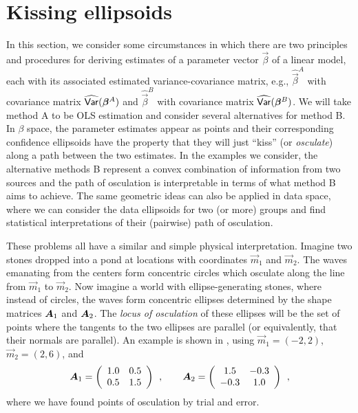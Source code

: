 %
\section{Kissing ellipsoids}
In this section, we consider some circumstances in which there are two 
principles and procedures for deriving estimates of a parameter vector $\vec{\beta}$
of a linear model,
each with its associated estimated variance-covariance matrix, e.g.,
$\widehat{\vec{\beta}}^A$ with covariance matrix $\widehat{\mathsf{Var}}(\bm{\beta}^A)$
and 
$\widehat{\vec{\beta}}^B$ with covariance matrix $\widehat{\mathsf{Var}}(\bm{\beta}^B)$.
We will take method A to be OLS estimation and consider several alternatives
for method B.  In $\beta$ space, the parameter estimates appear as points and their
corresponding confidence ellipsoids have the property that they will just ``kiss''
(or \emph{osculate}) along a path between the two estimates.
In the examples we consider, the alternative methods B represent a convex combination
of information from two sources and the path of osculation is interpretable in 
terms of what method B aims to achieve.
The same geometric ideas can also be applied in data space, where we can consider
the data ellipsoids for two (or more) groups and find statistical interpretations of
their (pairwise) path of osculation.

These problems all have a similar and simple physical interpretation.  Imagine two stones dropped
into a pond at locations with coordinates $\vec{m}_1$ and $\vec{m}_2$.  The waves emanating from the centers
form concentric circles which osculate along the line from $\vec{m}_1$ to $\vec{m}_2$.
Now imagine a world with ellipse-generating stones, where instead of circles, the waves form concentric ellipses determined by
the shape matrices $\bm{A}_1$ and $\bm{A}_2$.
The \emph{locus of osculation} of these ellipses will be the set of points where the tangents
to the two ellipses are parallel (or equivalently, that their normals are parallel).  An
example is shown in , using $\vec{m}_1 = (-2, 2)$, $\vec{m}_2 = (2, 6)$, and
\begin{equation} \label{eq:kiss-demoA}
\bm{A}_1 = \left(
\begin{array}{cc}
 1.0 & 0.5 \\ 0.5 & 1.5
\end{array}
\right)
\:\: ,\quad\quad
\bm{A}_2 =\left(
\begin{array}{cc}
 1.5 & -0.3 \\ -0.3 & 1.0
\end{array}
\right) \:\: ,
\end{equation}
where we have found points of osculation by trial and error.

